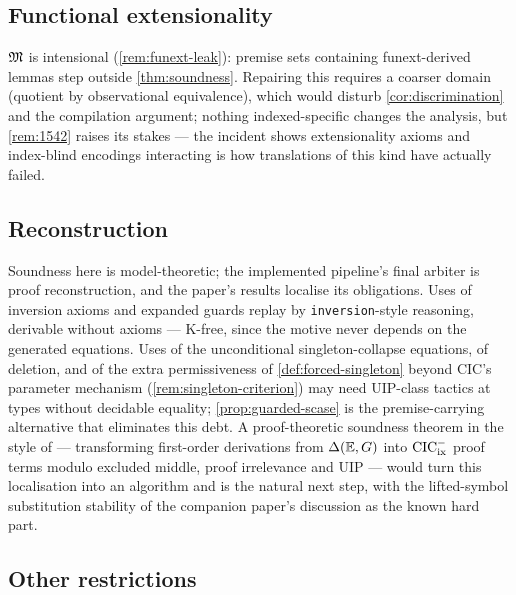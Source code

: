 \subsection{Functional extensionality}
\label{sec:limitations-funext}

$\mathfrak{M}$ is intensional (\cref{rem:funext-leak}): premise sets containing
funext-derived lemmas step outside \cref{thm:soundness}.  Repairing
this requires a coarser domain (quotient by observational equivalence),
which would disturb \cref{cor:discrimination} and the compilation
argument; nothing indexed-specific changes the analysis, but
\cref{rem:1542} raises its stakes --- the \fstar{} incident shows
extensionality axioms and index-blind encodings interacting is how
translations of this kind have actually failed.

\subsection{Reconstruction}
\label{sec:limitations-reconstruction}

Soundness here is model-theoretic; the implemented pipeline's final
arbiter is proof reconstruction, and the paper's results localise its
obligations.  Uses of inversion axioms and expanded guards replay by
\texttt{inversion}-style reasoning, derivable without axioms
\cite{CornesTerrasse1995,Monin2010} --- K-free, since the motive never
depends on the generated equations.  Uses of the unconditional
singleton-collapse equations, of deletion, and of the extra
permissiveness of \cref{def:forced-singleton} beyond CIC's parameter
mechanism (\cref{rem:singleton-criterion}) may need UIP-class tactics
at types without decidable equality; \cref{prop:guarded-scase} is the
premise-carrying alternative that eliminates this debt.  A
proof-theoretic soundness theorem in the style of \cite{Czajka2018} ---
transforming first-order derivations from $\Delta(\mathbb{E},G)$ into $\mathrm{CIC}^{-}_{\mathrm{ix}}$ proof
terms modulo excluded middle, proof irrelevance and UIP --- would turn
this localisation into an algorithm and is the natural next step, with
the lifted-symbol substitution stability of the companion paper's
discussion as the known hard part.

\subsection{Other restrictions}
\label{sec:limitations-misc}

